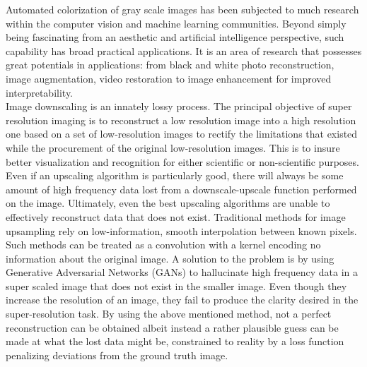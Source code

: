 \documentclass[oneside,a4paper,12pt]{report}
\begin{document}
\newpage

\setcounter{page}{0}
\frontmatter
{}
\rfoot{\thepage}


{   \setlength{\parindent}{11mm} }
{ \setlength{\parindent}{0mm} }
\hspace*{0.25 in}Automated colorization of gray scale images has been subjected to much research within the computer vision and machine learning communities. Beyond simply being fascinating from an aesthetic and artificial intelligence perspective, such capability has broad practical applications. It is an area of research that possesses great potentials in applications: from black and white photo reconstruction, image augmentation, video restoration to image enhancement for improved interpretability.\\
\hspace*{0.25 in}Image downscaling is an innately lossy process. The principal objective of super resolution imaging is to reconstruct a low resolution image into a high resolution one based on a set of low-resolution images to rectify the limitations that existed while the procurement of the original low-resolution images. This is to insure better visualization and recognition for either scientific or non-scientific purposes. Even if an upscaling algorithm is particularly good, there will always be some amount of high frequency data lost from a downscale-upscale function performed on the image. Ultimately, even the best upscaling algorithms are unable to effectively reconstruct data that does not exist. Traditional methods for image upsampling rely on low-information, smooth interpolation between known pixels. Such methods can be treated as a convolution with a kernel encoding no information about the original image. A solution to the problem is by using Generative Adversarial Networks (GANs) to hallucinate high frequency data in a super scaled image that does not exist in the smaller image. Even though they increase the resolution of an image, they fail to produce the clarity desired in the super-resolution task. By using the above mentioned method, not a perfect reconstruction can be obtained albeit instead a rather plausible guess can be made at what the lost data might be, constrained to reality by a loss function penalizing deviations from the ground truth image.\\
\end{document}
